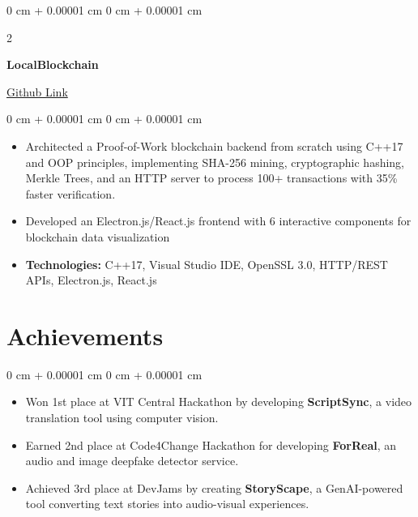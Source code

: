 \documentclass[10pt, letterpaper]{article}
\newenvironment{highlights}{
    \begin{itemize}[
        topsep=0.10 cm,
        parsep=0.10 cm,
        partopsep=0pt,
        itemsep=0pt,
        leftmargin=0 cm + 10pt
    ]
}{
    \end{itemize}
}
\newenvironment{onecolentry}{
    \begin{adjustwidth}{
        0 cm + 0.00001 cm
    }{
        0 cm + 0.00001 cm
    }
}{
    \end{adjustwidth}
}
\newenvironment{twocolentry}[2][]{
    \onecolentry
    \def\secondColumn{#2}
    \setcolumnwidth{\fill, 4.5 cm}
    \begin{paracol}{2}
}{
    \switchcolumn \raggedleft \secondColumn
    \end{paracol}
    \endonecolentry
}
\begin{document}
        \vspace{0.2 cm}

        \begin{twocolentry}{
            \href{https://github.com/anshmehta7x/SimpleBlockchain}{Github Link}
        }
            \textbf{LocalBlockchain}
        \end{twocolentry}

\vspace{0.10 cm}
\begin{onecolentry}
    \begin{highlights}
\item Architected a Proof-of-Work blockchain backend from scratch using C++17 and OOP principles, implementing SHA-256 mining, cryptographic hashing, Merkle Trees, and an HTTP server to process 100+ transactions with 35\% faster verification.
\item Developed an Electron.js/React.js frontend with 6 interactive components for blockchain data visualization
        \item \textbf{Technologies:} C++17, Visual Studio IDE, OpenSSL 3.0, HTTP/REST APIs, Electron.js, React.js
   \end{highlights}
\end{onecolentry}

\section{Achievements}

    \begin{onecolentry}
        \begin{highlights}
            \item Won 1st place at VIT Central Hackathon by developing \textbf{ScriptSync}, a video translation tool using computer vision.
            \item Earned 2nd place at Code4Change Hackathon for developing \textbf{ForReal}, an audio and image deepfake detector service.
            \item Achieved 3rd place at DevJams by creating \textbf{StoryScape}, a GenAI-powered tool converting text stories into audio-visual experiences.
        \end{highlights}
    \end{onecolentry}
\end{document}
